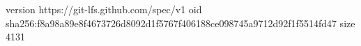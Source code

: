 version https://git-lfs.github.com/spec/v1
oid sha256:f8a98a89e8f4673726d8092d1f5767f406188ce098745a9712d92f1f5514fd47
size 4131
